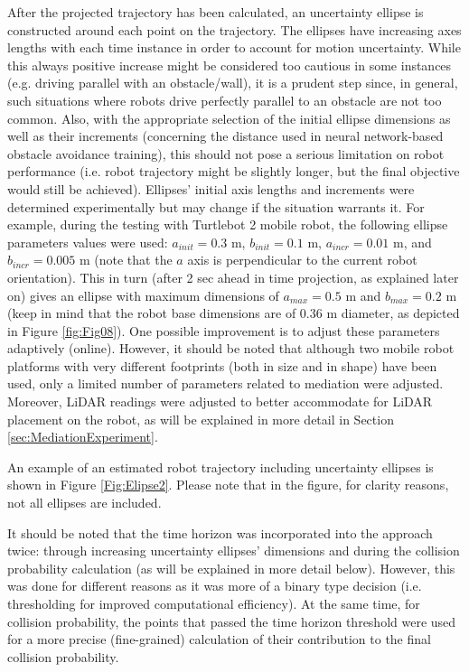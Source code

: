 After the projected trajectory has been calculated, an uncertainty ellipse is constructed around each point on the trajectory. The ellipses have increasing axes lengths with each time instance in order to account for motion uncertainty. While this always positive increase might be considered too cautious in some instances (e.g. driving parallel with an obstacle/wall), it is a prudent step since, in general, such situations where robots drive perfectly parallel to an obstacle are not too common. Also, with the appropriate selection of the initial ellipse dimensions as well as their increments (concerning the distance used in neural network-based obstacle avoidance training), this should not pose a serious limitation on robot performance (i.e. robot trajectory might be slightly longer, but the final objective would still be achieved). Ellipses' initial axis lengths and increments were determined experimentally but may change if the situation warrants it. For example, during the testing with Turtlebot 2 mobile robot, the following ellipse parameters values were used: $a_{init} = 0.3$ m, $b_{init} = 0.1$ m, $a_{incr} = 0.01$ m, and $b_{incr} = 0.005$ m (note that the $a$ axis is perpendicular to the current robot orientation). This in turn (after 2 sec ahead in time projection, as explained later on) gives an ellipse with maximum dimensions of $a_{max} = 0.5$ m and $b_{max} = 0.2$ m (keep in mind that the robot base dimensions are of 0.36 m diameter, as depicted in Figure \ref{fig:Fig08}). One possible improvement is to adjust these parameters adaptively (online). However, it should be noted that although two mobile robot platforms with very different footprints (both in size and in shape) have been used, only a limited number of parameters related to mediation were adjusted. Moreover, LiDAR readings were adjusted to better accommodate for LiDAR placement on the robot, as will be explained in more detail in Section \ref{sec:MediationExperiment}. 

An example of an estimated robot trajectory including uncertainty ellipses is shown in Figure \ref{Fig:Elipse2}. Please note that in the figure, for clarity reasons, not all ellipses are included. 

It should be noted that the time horizon was incorporated into the approach twice: through increasing uncertainty ellipses' dimensions and during the collision probability calculation (as will be explained in more detail below). However, this was done for different reasons as it was more of a binary type decision (i.e. thresholding for improved computational efficiency). At the same time, for collision probability, the points that passed the time horizon threshold were used for a more precise (fine-grained) calculation of their contribution to the final collision probability.

